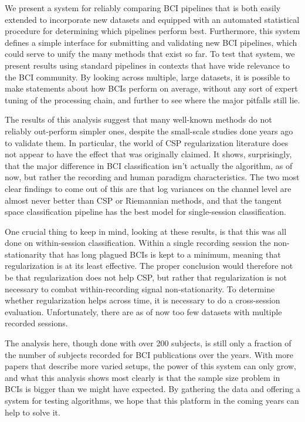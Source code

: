 We present a system for reliably comparing BCI pipelines that is both
easily extended to incorporate new datasets and equipped with an
automated statistical procedure for determining which pipelines
perform best. Furthermore, this system defines a simple interface for
submitting and validating new BCI pipelines, which could serve to
unify the many methods that exist so far. To test that system, we
present results using standard pipelines in contexts that have wide
relevance to the BCI community. By looking across multiple, large
datasets, it is possible to make statements about how BCIs perform on
average, without any sort of expert tuning of the processing chain,
and further to see where the major pitfalls still lie.

The results of this analysis suggest that many well-known methods do
not reliably out-perform simpler ones, despite the small-scale studies
done years ago to validate them. In particular, the world of CSP
regularization literature does not appear to have the effect that was
originally claimed. It shows, surprisingly, that the
major difference in BCI classification isn't actually the algorithm, as of now,
but rather the recording and human paradigm characteristics. The two
most clear findings to come out of this are that log variances on the
channel level are almost never better than CSP or Riemannian methods,
and that the tangent space classification pipeline has the best model
for single-session classification.

One crucial thing to keep in mind, looking at these results, is that this was
all done on within-session classification. Within a single recording session the
non-stationarity that has long plagued BCIs is kept to a minimum, meaning that
regularization is at its least effective. The proper conclusion would therefore
not be that regularization does not help CSP, but rather that regularization is
not necessary to combat within-recording signal non-stationarity. To determine
whether regularization helps across time, it is necessary to do a cross-session
evaluation. Unfortunately, there are as of now too few datasets with multiple
recorded sessions.

The analysis here, though done with over 200 subjects, is still only a
fraction of the number of subjects recorded for BCI publications over
the years. With more papers that describe more varied setups, the
power of this system can only grow, and what this analysis shows most
clearly is that the sample size problem in BCIs is bigger than we
might have expected. By gathering the data and offering a system for
testing algorithms, we hope that this platform in the coming years can
help to solve it.

